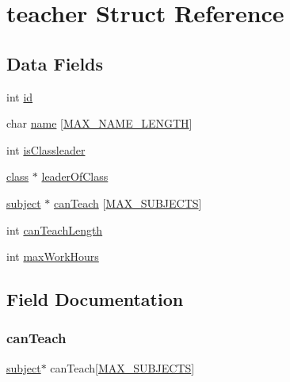 \hypertarget{structteacher}{}\section{teacher Struct Reference}
\label{structteacher}
\subsection*{Data Fields}
\begin{DoxyCompactItemize}
\item 
int \hyperlink{structteacher_a7441ef0865bcb3db9b8064dd7375c1ea}{id}
\item 
char \hyperlink{structteacher_ad50982abf9e9bbbc784f8f17fa25b1b2}{name} \mbox{[}\hyperlink{main_8c_a0c397a708cec89c74029582574516b30}{M\+A\+X\+\_\+\+N\+A\+M\+E\+\_\+\+L\+E\+N\+G\+TH}\mbox{]}
\item 
int \hyperlink{structteacher_a6120a3cee2c5bb1e10db23a543a20a8a}{is\+Classleader}
\item 
\hyperlink{structclass}{class} $\ast$ \hyperlink{structteacher_a7fcc02effcf952684962b4481e328964}{leader\+Of\+Class}
\item 
\hyperlink{structsubject}{subject} $\ast$ \hyperlink{structteacher_a508916d3a3409b34215e4ca8fe608ed7}{can\+Teach} \mbox{[}\hyperlink{main_8c_ae955f276de63586aaf0c290d32652706}{M\+A\+X\+\_\+\+S\+U\+B\+J\+E\+C\+TS}\mbox{]}
\item 
int \hyperlink{structteacher_ac5f08fdd49a83d7053ba26b1c1c71e8a}{can\+Teach\+Length}
\item 
int \hyperlink{structteacher_a3f74b78dd29a3ee2e03f00567ea9b333}{max\+Work\+Hours}
\end{DoxyCompactItemize}


\subsection{Field Documentation}
\hypertarget{structteacher_a508916d3a3409b34215e4ca8fe608ed7}{}\label{structteacher_a508916d3a3409b34215e4ca8fe608ed7} 
\subsubsection{\texorpdfstring{can\+Teach}{canTeach}}
{\footnotesize\ttfamily \hyperlink{structsubject}{subject}$\ast$ can\+Teach\mbox{[}\hyperlink{main_8c_ae955f276de63586aaf0c290d32652706}{M\+A\+X\+\_\+\+S\+U\+B\+J\+E\+C\+TS}\mbox{]}}

